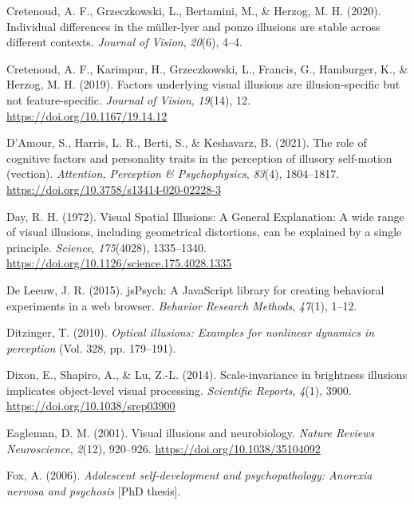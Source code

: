\documentclass[
  man,floatsintext]{apa6}
\newlength{\cslhangindent}
\newlength{\cslentryspacingunit} %
\newenvironment{CSLReferences}[2] %
 {%
  \setlength{\parindent}{0pt}
  \ifodd #1
  \let\oldpar\par
  \def\par{\hangindent=\cslhangindent\oldpar}
  \fi
  \setlength{\parskip}{#2\cslentryspacingunit}
 }%
 {}
\begin{document}
\begin{CSLReferences}{1}{0}
\leavevmode{}%
Cretenoud, A. F., Grzeczkowski, L., Bertamini, M., \& Herzog, M. H. (2020). Individual differences in the m{ü}ller-lyer and ponzo illusions are stable across different contexts. \emph{Journal of Vision}, \emph{20}(6), 4--4.

\leavevmode{}%
Cretenoud, A. F., Karimpur, H., Grzeczkowski, L., Francis, G., Hamburger, K., \& Herzog, M. H. (2019). Factors underlying visual illusions are illusion-specific but not feature-specific. \emph{Journal of Vision}, \emph{19}(14), 12. \url{https://doi.org/10.1167/19.14.12}

\leavevmode{}%
D'Amour, S., Harris, L. R., Berti, S., \& Keshavarz, B. (2021). The role of cognitive factors and personality traits in the perception of illusory self-motion (vection). \emph{Attention, Perception \& Psychophysics}, \emph{83}(4), 1804--1817. \url{https://doi.org/10.3758/s13414-020-02228-3}

\leavevmode{}%
Day, R. H. (1972). Visual Spatial Illusions: A General Explanation: A wide range of visual illusions, including geometrical distortions, can be explained by a single principle. \emph{Science}, \emph{175}(4028), 1335--1340. \url{https://doi.org/10.1126/science.175.4028.1335}

\leavevmode{}%
De Leeuw, J. R. (2015). jsPsych: A JavaScript library for creating behavioral experiments in a web browser. \emph{Behavior Research Methods}, \emph{47}(1), 1--12.

\leavevmode{}%
Ditzinger, T. (2010). \emph{Optical illusions: Examples for nonlinear dynamics in perception} (Vol. 328, pp. 179--191).

\leavevmode{}%
Dixon, E., Shapiro, A., \& Lu, Z.-L. (2014). Scale-invariance in brightness illusions implicates object-level visual processing. \emph{Scientific Reports}, \emph{4}(1), 3900. \url{https://doi.org/10.1038/srep03900}

\leavevmode{}%
Eagleman, D. M. (2001). Visual illusions and neurobiology. \emph{Nature Reviews Neuroscience}, \emph{2}(12), 920--926. \url{https://doi.org/10.1038/35104092}

\leavevmode{}%
Fox, A. (2006). \emph{Adolescent self-development and psychopathology: Anorexia nervosa and psychosis} {[}PhD thesis{]}.


\end{CSLReferences}
\end{document}
